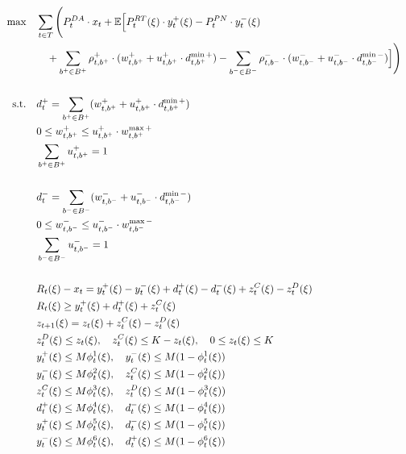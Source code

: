 \documentclass[10pt]{article}
\begin{document}
\begin{subequations}
    \begin{align}
        \text{max} \quad & \sum_{t\in T} \Bigg( P_t^{DA} \cdot x_t 
        + \mathbb{E} \Big[ P_t^{RT}(\xi) \cdot y_t^+(\xi) - P_t^{PN} \cdot y_t^-(\xi) & \notag \\
        &\quad + \sum_{b^+ \in B^+} \rho^+_{t,b^+} \cdot (w^+_{t,b^+} + u^+_{t,b^+} \cdot d^{\min+}_{t,b^+}) 
        - \sum_{b^- \in B^-} \rho^-_{t,b^-} \cdot (w^-_{t,b^-} + u^-_{t,b^-} \cdot d^{\min-}_{t,b^-}) \Big] \Bigg) & \\
        &&\\ \notag
        \text{s.t.} \quad & d^{+}_{t} = \sum_{b^+ \in B^+} (w^+_{t,b^+} + u^+_{t,b^+} \cdot d^{\min+}_{t,b^+})& \\
        & 0 \leq w^+_{t,b^+} \leq u^+_{t,b^+} \cdot w^{\max+}_{t,b^+}&\\
        & \sum_{b^+ \in B^+} u^+_{t,b^+} = 1 &\\
        &&\\ \notag
        & d^{-}_{t} = \sum_{b^- \in B^-} (w^-_{t,b^-} + u^-_{t,b^-} \cdot d^{\min-}_{t,b^-})&\\
        & 0 \leq w^-_{t,b^-} \leq u^-_{t,b^-} \cdot w^{\max-}_{t,b^-}&\\
        & \sum_{b^- \in B^-} u^-_{t,b^-} = 1 &\\
        &&\\ \notag
        & R_{t}(\xi) - x_{t} = y_{t}^{+}(\xi) - y_{t}^{-}(\xi) + d^+_{t}(\xi) - d^-_{t}(\xi) + z^C_{t}(\xi) - z^D_{t}(\xi) & \\
        & R_{t}(\xi) \geq y^+_t(\xi) + d^+_{t}(\xi) + z^C_{t}(\xi) & \\
        & z_{t+1}(\xi) = z_{t}(\xi) + z^C_{t}(\xi) - z^D_{t}(\xi) & \\
        & z^D_{t}(\xi) \le z_{t}(\xi), \quad z^C_{t}(\xi) \le K - z_{t}(\xi), \quad 0 \leq z_{t}(\xi) \leq K & \\
        & y^+_{t}(\xi) \leq M \phi^1_{t}(\xi), \quad y^-_{t}(\xi) \leq M (1 - \phi^1_{t}(\xi)) & \\
        & y^-_{t}(\xi) \leq M \phi^2_{t}(\xi), \quad z^C_{t}(\xi) \leq M (1 - \phi^2_{t}(\xi)) & \\
        & z^C_{t}(\xi) \leq M \phi^3_{t}(\xi), \quad z^D_{t}(\xi) \leq M (1 - \phi^3_{t}(\xi)) & \\
        & d^+_{t}(\xi) \leq M \phi^4_{t}(\xi), \quad d^-_{t}(\xi) \leq M (1 - \phi^4_{t}(\xi)) & \\
        & y^+_{t}(\xi) \leq M \phi^5_{t}(\xi), \quad d^-_{t}(\xi) \leq M (1 - \phi^5_{t}(\xi)) & \\
        & y^-_{t}(\xi) \leq M \phi^6_{t}(\xi), \quad d^+_{t}(\xi) \leq M (1 - \phi^6_{t}(\xi)) & 
    \end{align}
\end{subequations}
\end{document}
